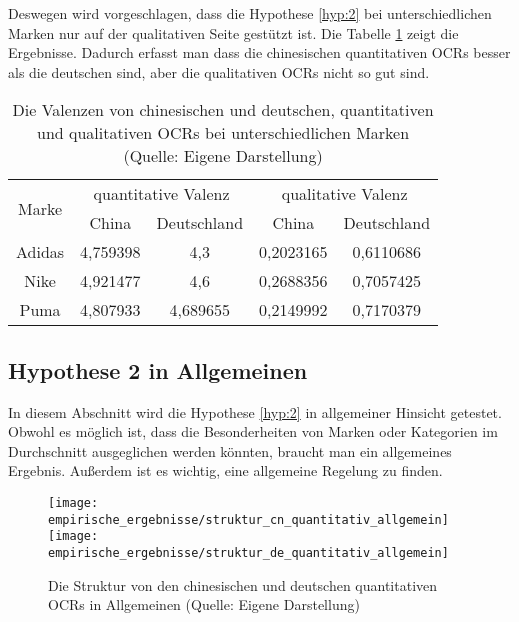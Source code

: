Deswegen wird vorgeschlagen, dass die Hypothese \ref{hyp:2} bei unterschiedlichen Marken nur auf der qualitativen Seite gestützt ist. Die Tabelle \ref{tab:valenz_marken} zeigt die Ergebnisse. Dadurch erfasst man dass die chinesischen quantitativen \ac{OCRs} besser als die deutschen sind, aber die qualitativen \ac{OCRs} nicht so gut sind. 

\begin{table}[h]
\centering
\begin{tabular}{|c|c|c|c|c|}
\hline
\multirow{2}{*}{Marke} & \multicolumn{2}{c|}{quantitative Valenz} & \multicolumn{2}{c|}{qualitative Valenz} \\ \cline{2-5} 
                       & China             & Deutschland          & China             & Deutschland         \\ \hline
Adidas                 & 4,759398          & 4,3                  & 0,2023165         & 0,6110686           \\ \hline
Nike                   & 4,921477          & 4,6                  & 0,2688356         & 0,7057425           \\ \hline
Puma                   & 4,807933          & 4,689655             & 0,2149992         & 0,7170379           \\ \hline
\end{tabular}
\caption[Die Valenzen von chinesischen und deutschen, quantitativen und qualitativen OCRs bei unterschiedlichen Marken]{Die Valenzen von chinesischen und deutschen, quantitativen und qualitativen \ac{OCRs} bei unterschiedlichen Marken (Quelle: Eigene Darstellung)}
\label{tab:valenz_marken}
\end{table}

\subsection{Hypothese 2 in Allgemeinen}
In diesem Abschnitt wird die Hypothese \ref{hyp:2} in allgemeiner Hinsicht getestet. Obwohl es möglich ist, dass die Besonderheiten von Marken oder Kategorien im Durchschnitt ausgeglichen werden könnten, braucht man ein allgemeines Ergebnis. Außerdem ist es wichtig, eine allgemeine Regelung zu finden.
\begin{figure}[htb]
    {\texttt{[image: empirische\_ergebnisse/struktur\_cn\_quantitativ\_allgemein]}}    
    {\texttt{[image: empirische\_ergebnisse/struktur\_de\_quantitativ\_allgemein]}}   
    \caption[Die Struktur von den chinesischen und deutschen quantitativen OCRs in Allgemeinen]{Die Struktur von den chinesischen und deutschen quantitativen \ac{OCRs} in Allgemeinen (Quelle: Eigene Darstellung)}
    \label{fig:struktur_allgemein}
\end{figure}

